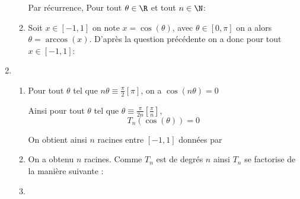 \documentclass[a4paper, 11pt,reqno]{article}
\begin{document}
\begin{correction}
\begin{enumerate}
\begin{enumerate}
Par récurrence, Pour tout $\theta \in \R$ et tout $n\in \N$:



\item Soit $x\in [-1,1]$ on  note $x =\cos(\theta)$, avec $\theta \in [0,\pi]$ on a  alors 
$\theta =\arccos( x) $. D'après la question précédente on a donc pour tout $x\in [-1,1]$: 



\end{enumerate}
\item 
\begin{enumerate}
\item Pour tout $\theta $ tel que $n\theta  \equiv \frac{\pi}{2}[\pi]$,  on a $\cos(n\theta) =0$ 

Ainsi pour tout $\theta $ tel que $\theta \equiv \frac{\pi}{2n}[\frac{\pi}{n}]$, 
$$T_n(\cos(\theta) ) =0$$

On obtient ainsi $n$ racines entre $[-1,1]$ données par 

\item On a obtenu $n$ racines. Comme $T_n$ est de degrés $n$  ainsi $T_n$ se factorise de la manière suivante :
\item {}

\end{enumerate}

\end{enumerate}
\end{correction}
\vspace{1cm}
\end{document}
